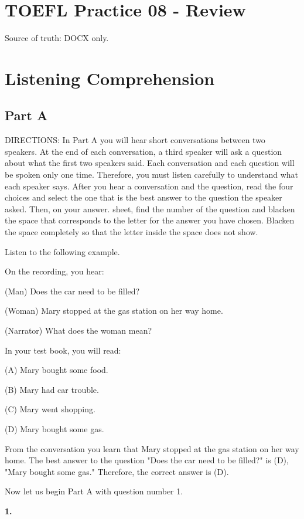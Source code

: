 \documentclass[12pt]{article}
\begin{document}
\section*{TOEFL Practice 08 - Review}
Source of truth: DOCX only.
\section*{Listening Comprehension}
\subsection*{Part A}
DIRECTIONS: In Part A you will hear short conversations between two speakers. At the end of each conversation, a third speaker will ask a question about what the first two speakers said. Each conversation and each question will be spoken only one time. Therefore, you must listen carefully to understand what each speaker says. After you hear a conversation and the question, read the four choices and select the one that is the best answer to the question the speaker asked. Then, on your answer. sheet, find the number of the question and blacken the space that corresponds to the letter for the answer you have chosen. Blacken the space completely so that the letter inside the space does not show.\par
\begin{exampleblock}
Listen to the following example.\par
On the recording, you hear:\par
(Man) Does the car need to be filled?\par
(Woman) Mary stopped at the gas station on her way home.\par
(Narrator) What does the woman mean?\par
In your test book, you will read:\par
(A) Mary bought some food.\par
(B) Mary had car trouble.\par
(C) Mary went shopping.\par
(D) Mary bought some gas.\par
From the conversation you learn that Mary stopped at the gas station on her way home. The best answer to the question "Does the car need to be filled?" is (D), "Mary bought some gas." Therefore, the correct answer is (D).\par
Now let us begin Part A with question number 1.\par
\end{exampleblock}
\noindent\textbf{1.}
\end{document}
